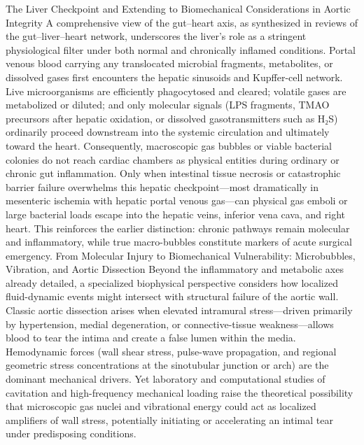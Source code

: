 The Liver Checkpoint and Extending to Biomechanical Considerations in Aortic Integrity
A comprehensive view of the gut–heart axis, as synthesized in reviews of the gut–liver–heart network, underscores the liver’s role as a stringent physiological filter under both normal and chronically inflamed conditions. Portal venous blood carrying any translocated microbial fragments, metabolites, or dissolved gases first encounters the hepatic sinusoids and Kupffer-cell network. Live microorganisms are efficiently phagocytosed and cleared; volatile gases are metabolized or diluted; and only molecular signals (LPS fragments, TMAO precursors after hepatic oxidation, or dissolved gasotransmitters such as H₂S) ordinarily proceed downstream into the systemic circulation and ultimately toward the heart. Consequently, macroscopic gas bubbles or viable bacterial colonies do not reach cardiac chambers as physical entities during ordinary or chronic gut inflammation. Only when intestinal tissue necrosis or catastrophic barrier failure overwhelms this hepatic checkpoint—most dramatically in mesenteric ischemia with hepatic portal venous gas—can physical gas emboli or large bacterial loads escape into the hepatic veins, inferior vena cava, and right heart. This reinforces the earlier distinction: chronic pathways remain molecular and inflammatory, while true macro-bubbles constitute markers of acute surgical emergency.
From Molecular Injury to Biomechanical Vulnerability: Microbubbles, Vibration, and Aortic Dissection
Beyond the inflammatory and metabolic axes already detailed, a specialized biophysical perspective considers how localized fluid-dynamic events might intersect with structural failure of the aortic wall. Classic aortic dissection arises when elevated intramural stress—driven primarily by hypertension, medial degeneration, or connective-tissue weakness—allows blood to tear the intima and create a false lumen within the media. Hemodynamic forces (wall shear stress, pulse-wave propagation, and regional geometric stress concentrations at the sinotubular junction or arch) are the dominant mechanical drivers. Yet laboratory and computational studies of cavitation and high-frequency mechanical loading raise the theoretical possibility that microscopic gas nuclei and vibrational energy could act as localized amplifiers of wall stress, potentially initiating or accelerating an intimal tear under predisposing conditions.
